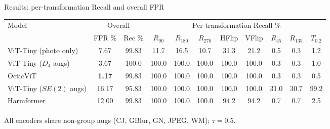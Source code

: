 \documentclass[aspectratio=169]{beamer}
\begin{document}
\begin{frame}{Results: per-transformation Recall and overall FPR}
    \begin{table}
    \centering
    \scriptsize
    \setlength{\tabcolsep}{3pt}
    \begin{tabular}{@{}lcccccccccc@{}}
    \toprule
    \multirow{2}{*}{Model} & \multicolumn{2}{c}{Overall} & \multicolumn{8}{c}{Per-transformation Recall \%} \\
    \cmidrule(lr){2-3}\cmidrule(lr){4-11}
    & FPR \% & Rec \% & $R_{90}$ & $R_{180}$ & $R_{270}$ & HFlip & VFlip & $R_{45}$ & $R_{135}$ & $T_{0.2}$ \\
    \midrule
    ViT-Tiny (photo only)            & 7.67          & 99.83  & 11.7  & 16.5  & 10.7  & 31.3  & 21.2  & 0.5   & 0.3   & 1.2   \\
    \midrule
    ViT-Tiny ($D_4$ augs)              & 3.67          & 100.0  & 100.0 & 100.0 & 100.0 & 100.0 & 100.0 & 0.3   & 0.3   & 1.0   \\
    OcticViT                          & \textbf{1.17} & 99.83  & 100.0 & 100.0 & 100.0 & 100.0 & 100.0 & 0.3   & 0.3   & 0.5   \\
    \midrule
    ViT-Tiny ($SE(2)$ augs)            & 16.17         & 95.83  & 100.0 & 100.0 & 100.0 & 100.0 & 100.0 & 31.0  & 30.7  & 99.2  \\
    Harmformer                        & 12.00         & 99.83  & 100.0 & 100.0 & 100.0 & 94.2  & 94.2  & 0.7   & 0.7   & 2.5   \\
    \bottomrule
    \end{tabular}
    \end{table}
    All encoders share non-group augs (CJ, GBlur, GN, JPEG, WM); $\tau=0.5$.
\end{frame}
\end{document}
